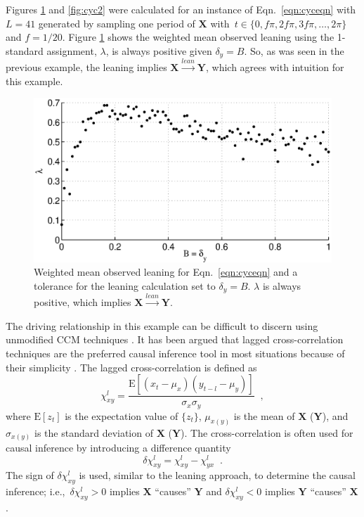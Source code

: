 \documentclass[twocolumn,aps,pre,groupedaddress]{revtex4-1}
\begin{document}
Figures \ref{fig:cyc1} and \ref{fig:cyc2} were calculated for an instance of Eqn.\ \ref{eqn:cyceqn} with $L=41$ generated by sampling one period of $\mathbf{X}$ with\ $t\in\{0,f\pi,2f\pi,3f\pi,\ldots,2\pi\}$ and $f=1/20$.  Figure \ref{fig:cyc1} shows the weighted mean observed leaning using the 1-standard assignment, $\lambda$, is always positive given $\delta_y=B$.  So, as was seen in the previous example, the leaning implies $\mathbf{X}\xrightarrow{lean}\mathbf{Y}$, which agrees with intuition for this example. 
\begin{figure}[ht]
\includegraphics[scale=0.45]{SimpleCyclicexample_Bxytol.eps}
\caption{Weighted mean observed leaning for Eqn.\ \ref{eqn:cyceqn} and a tolerance for the leaning calculation set to $\delta_y=B$.  $\lambda$ is always positive, which implies $\mathbf{X}\xrightarrow{lean}\mathbf{Y}$.}
\label{fig:cyc1}
\end{figure}

The driving relationship in this example can be difficult to discern using unmodified CCM techniques \cite{Weigel2014}.  It has been argued that lagged cross-correlation techniques are the preferred causal inference tool in most situations because of their simplicity \cite{McNames2007}.  The lagged cross-correlation is defined as
\begin{equation}
\chi_{xy}^l = \frac{\mathrm{E}\left[\left(x_t-\mu_x\right)\left(y_{t-l}-\mu_y\right)\right]}{\sigma_x\sigma_y}\;\;,
\end{equation}
where $\mathrm{E}[z_t]$ is the expectation value of $\{z_t\}$, $\mu_{x(y)}$ is the mean of $\mathbf{X}$ ($\mathbf{Y}$), and $\sigma_{x(y)}$ is the standard deviation of $\mathbf{X}$ ($\mathbf{Y}$).  The cross-correlation is often used for causal inference by introducing a difference quantity \cite{Rogosa1980}
\begin{equation}
\delta\chi_{xy}^l = \chi_{xy}^l - \chi_{yx}^l\;\;.
\end{equation}
The sign of $\delta\chi_{xy}^l$ is used, similar to the leaning approach, to determine the causal inference; i.e.,\  $\delta\chi_{xy}^l>0$ implies $\mathbf{X}$ ``causes'' $\mathbf{Y}$ and $\delta\chi_{xy}^l<0$ implies $\mathbf{Y}$ ``causes'' $\mathbf{X}$ \cite{Rogosa1980}.  
\end{document}
